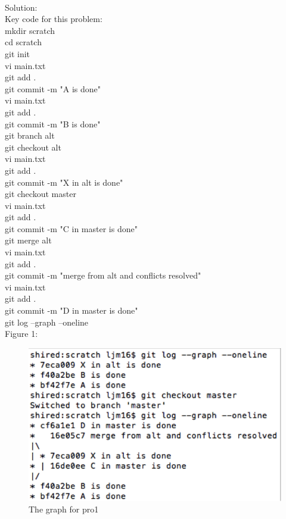 \documentclass[12pt]{article}
\begin{document}
\noindent\ \\Solution:\\
Key code for this problem: \\
mkdir scratch \\
cd scratch\\
git init\\
vi main.txt\\
git add .\\
git commit -m "A is done"\\
vi main.txt\\
git add .\\
git commit -m "B is done"\\
git branch alt\\
git checkout alt\\
vi main.txt\\
git add .\\
git commit -m "X in alt is done"\\
git checkout master\\
vi main.txt\\
git add .\\
git commit -m "C in master is done"\\
git merge alt\\
vi main.txt\\
git add .\\
git commit -m "merge from alt and conflicts resolved"\\
vi main.txt\\
git add .\\
git commit -m "D in master is done"\\
git log --graph --oneline\\

Figure 1:\\
\begin{figure}[h]
    \begin{center}
        \includegraphics[scale=0.6]{pro.png}
    \end{center}
    \caption{The graph for pro1}
    \label{fig:branch}
\end{figure}
\\
\\
\end{document}

